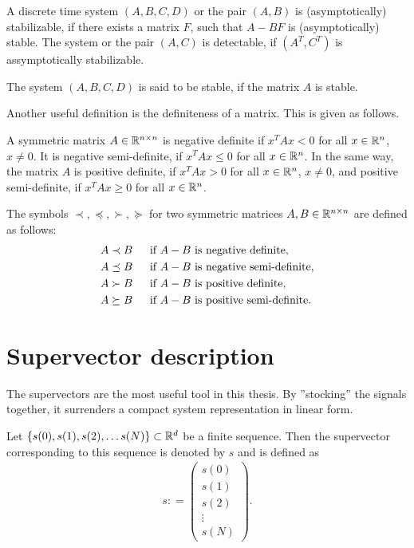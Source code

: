 \begin{defi}
A discrete time system $(A, B, C, D)$ or the pair $(A, B)$ is (asymptotically) stabilizable, if there exists a matrix $F$, such that $A - BF$ is (asymptotically) stable.
The system or the pair $(A,C)$ is detectable, if $(A^T, C^T)$ is assymptotically stabilizable. 

The system $(A,B,C,D)$ is said to be stable, if the matrix $A$ is stable. 
\end{defi}

Another useful definition is the definiteness of a matrix. This is given as follows. 
\begin{defi}
	A symmetric matrix $A \in {\mathbb{R}}^{n \times n}$ is negative definite if $x^T A x < 0$ for all $x \in {\mathbb{R}}^n$, $x \neq 0$. It is negative semi-definite, if $x^T A x \leq 0$ for all $x \in {\mathbb{R}}^n$. 
	In the same way, the matrix $A$ is positive definite, if $x^T A x >0$ for all $x \in {\mathbb{R}}^n$, $x \neq 0$, and positive semi-definite, if $x^T A x \geq 0$ for all $x \in {\mathbb{R}}^n$. 
	
	The symbols $\prec, \preceq, \succ, \succeq$ for two symmetric matrices $A, B \in {\mathbb{R}}^{n \times n}$ are defined as follows:
	\begin{subequations}
		\begin{align}
		A \prec B & \text{ \; \; if } A - B \text{ is negative definite},
		\\
		A \preceq B & \text{ \; \; if } A - B \text{ is negative semi-definite},		
		\\
		A \succ B & \text{ \; \; if } A - B \text{ is positive definite},
		\\
		A \succeq B & \text{ \; \; if } A - B \text{ is positive semi-definite}.
		\end{align}
	\end{subequations}
\end{defi}

\section{Supervector description} 

The supervectors are the most useful tool in this thesis. By ''stocking'' the signals together, it surrenders a compact system representation in linear form.

\begin{defi}
	Let $\{s(0), s(1), s(2), \dots s(N)\} \subset {\mathbb{R}}^{d}$ be a finite sequence. Then the supervector corresponding to this sequence is denoted by $s$ and is defined as 
	\begin{align}
	s: = \begin{pmatrix}
	s(0) \\ s(1) \\ s(2) \\ \vdots \\ s(N)
	\end{pmatrix}.
	\end{align}
\end{defi}

